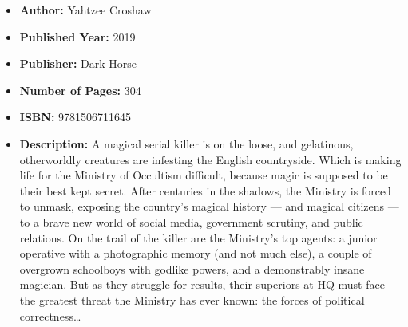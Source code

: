 \documentclass{tufte-handout}
\begin{document}
\begin{itemize}
    \item[] \textbf{Author:} Yahtzee Croshaw
    \item[] \textbf{Published Year:} 2019 
    \item[] \textbf{Publisher:} Dark Horse
    \item[] \textbf{Number of Pages:} 304      
    \item[] \textbf{ISBN:} 9781506711645
    \item[] \textbf{Description:} A magical serial killer is on the loose, and gelatinous, otherworldly creatures are infesting the English countryside. Which is making life for the Ministry of Occultism difficult, because magic is supposed to be their best kept secret. After centuries in the shadows, the Ministry is forced to unmask, exposing the country's magical history --- and magical citizens --- to a brave new world of social media, government scrutiny, and public relations. On the trail of the killer are the Ministry's top agents: a junior operative with a photographic memory (and not much else), a couple of overgrown schoolboys with godlike powers, and a demonstrably insane magician. But as they struggle for results, their superiors at HQ must face the greatest threat the Ministry has ever known: the forces of political correctness\ldots \end{itemize}
\end{document}
